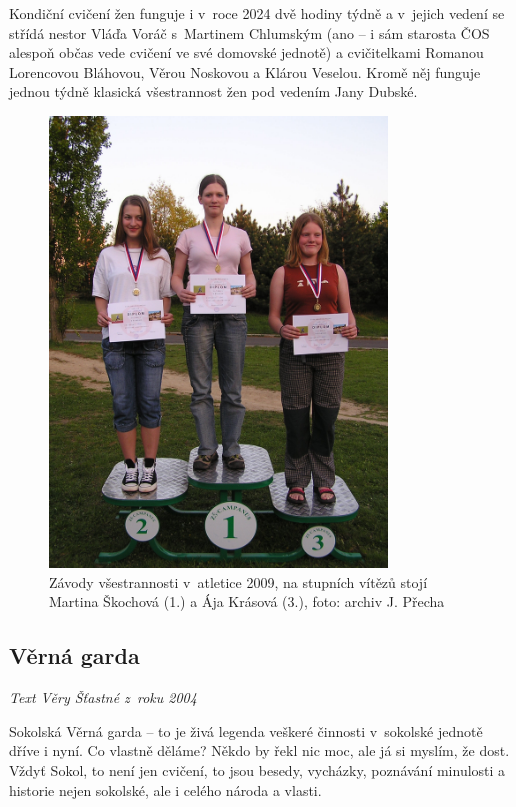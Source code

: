 \documentclass[a5paper, 11pt, twoside]{article}
\begin{document}
Kondiční cvičení žen funguje i v~roce 2024 dvě hodiny týdně a v~jejich
vedení se střídá nestor Vláďa Voráč s~Martinem Chlumským (ano -- i sám
starosta ČOS alespoň občas vede cvičení ve své domovské jednotě) a
cvičitelkami Romanou Lorencovou Bláhovou, Věrou Noskovou a Klárou
Veselou. Kromě něj funguje jednou týdně klasická všestrannost žen pod
vedením Jany Dubské.

\begin{figure}[h!]
  \centering 
  \includegraphics[width=0.8\textwidth]{img/74_zavody_atletika.JPG}
  \caption*{Závody všestrannosti v~atletice 2009, na stupních vítězů stojí
  Martina Škochová (1.) a Ája Krásová (3.), foto: archiv J. Přecha}
\end{figure}

\subsection{Věrná garda}

\begin{center}
  \textit{Text Věry Šťastné z~roku 2004}
\end{center}

Sokolská Věrná garda -- to je živá legenda veškeré činnosti v~sokolské
jednotě dříve i nyní. Co vlastně děláme? Někdo by řekl nic moc, ale já
si myslím, že dost. Vždyť Sokol, to není jen cvičení, to jsou besedy,
vycházky, poznávání minulosti a historie nejen sokolské, ale i celého
národa a vlasti.
\end{document}
